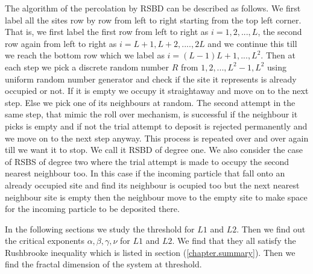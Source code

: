 	The algorithm of the percolation by RSBD can be described as follows. We first label all the sites
	row by row from left to right starting from the top left corner. That is, we first label the first row from
	left to right as $i=1,2,...,L$, the second row again from left to right as $i=L+1,L+2,....,2L$
	and we continue this till we reach the bottom row which we label as $i=(L-1)L+1,...,L^2$. 
	Then at each step we pick a discrete random number $R$ from $1,2,...,L^2-1,L^2$ using uniform random number
	generator and check if the site it represents is already occupied or not. If it is
	empty we occupy it straightaway and move on to the next step. Else we pick one of its neighbours at random. 
	The second attempt in the same step, that mimic the roll over mechanism, is successful if the neighbour
	it picks is empty and if not the trial attempt to deposit is rejected permanently and we move on to the next 
	step anyway. This process is
	repeated over and over again till we want it to stop. We call it RSBD of degree one. We also consider
	the case of RSBS of degree two where the trial attempt is made to occupy the second nearest neighbour too.
	In this case if the incoming particle that fall onto an already occupied site and find its 
	neighbour is ocupied too but the next nearest neighbour site is empty then the neighbour move to the empty
	site to make space for the incoming particle to be deposited there. 
	
	In the following sections we study the threshold for $L1$ and $L2$. Then we find out the critical exponents $\alpha, \beta, \gamma, \nu$ for $L1$ and $L2$. We find that they all satisfy the Rushbrooke inequality which is listed in section (\ref{chapter.summary}). Then we find the fractal dimension of the system at threshold.


	\label{sect:finding-numerical-values}

